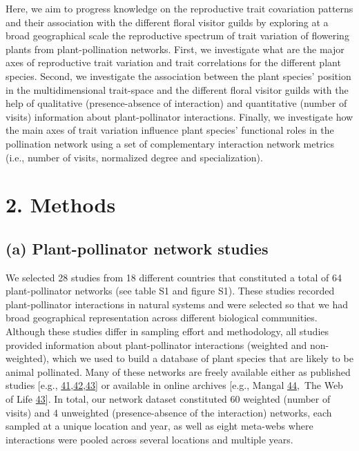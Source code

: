 \documentclass[
  12pt,
  a4paper,
]{article}
\begin{document}
Here, we aim to progress knowledge on the reproductive trait covariation patterns and their association with the different floral visitor guilds by exploring at a broad geographical scale the reproductive spectrum of trait variation of flowering plants from plant-pollination networks. First, we investigate what are the major axes of reproductive trait variation and trait correlations for the different plant species. Second, we investigate the association between the plant species' position in the multidimensional trait-space and the different floral visitor guilds with the help of qualitative (presence-absence of interaction) and quantitative (number of visits) information about plant-pollinator interactions. Finally, we investigate how the main axes of trait variation influence plant species' functional roles in the pollination network using a set of complementary interaction network metrics (i.e., number of visits, normalized degree and specialization).

\hypertarget{methods}{%
\section{2. Methods}\label{methods}}

\hypertarget{a-plant-pollinator-network-studies}{%
\subsection{(a) Plant-pollinator network studies}\label{a-plant-pollinator-network-studies}}

We selected 28 studies from 18 different countries that constituted a total of 64 plant-pollinator networks (see table S1 and figure S1). These studies recorded plant-pollinator interactions in natural systems and were selected so that we had broad geographical representation across different biological communities. Although these studies differ in sampling effort and methodology, all studies provided information about plant-pollinator interactions (weighted and non-weighted), which we used to build a database of plant species that are likely to be animal pollinated. Many of these networks are freely available either as published studies {[}e.g., \protect\hyperlink{ref-carvalheiro2014}{41},\protect\hyperlink{ref-olesen2007}{42},\protect\hyperlink{ref-fortuna2010}{43}{]} or available in online archives {[}e.g., Mangal \protect\hyperlink{ref-poisot2016}{44},~The Web of Life \protect\hyperlink{ref-fortuna2010}{43}{]}. In total, our network dataset constituted 60 weighted (number of visits) and 4 unweighted (presence-absence of the interaction) networks, each sampled at a unique location and year, as well as eight meta-webs where interactions were pooled across several locations and multiple years.
\end{document}

